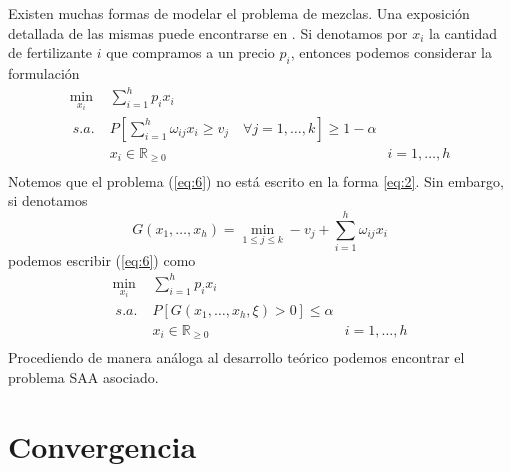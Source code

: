 \documentclass[twoside,a4paper,openright,12pt]{book}
\newcommand{\R}{\mathbb{R}}
\begin{document}
Existen muchas formas de modelar el problema de mezclas. Una exposición detallada de las mismas puede encontrarse en \cite{mixing}. Si denotamos por $x_i$ la cantidad de fertilizante $i$ que compramos a un precio $p_i$, entonces podemos considerar la formulación
\begin{align*}	
\min_{x_i} &\; \sum_{i=1}^h p_ix_i 
\\\
s.a.
& \; P\left[\sum_{i=1}^h \omega_{ij}x_i \geq v_j \quad \forall j=1,\dotsc,k\right]\geq 1-\alpha &\tag{6}\label{eq:6}\\
& \; x_i\in\R_{\geq 0} & i=1,\dotsc,h\\
\end{align*}
Notemos que el problema (\ref{eq:6}) no está escrito en la forma \ref{eq:2}. Sin embargo, si denotamos 
$$
G(x_1,\dotsc,x_h)=\min_{1\leq j \leq k}-v_j + \sum_{i=1}^h \omega_{ij}x_i
$$
podemos escribir (\ref{eq:6}) como 
\begin{align*}	
\min_{x_i} &\; \sum_{i=1}^h p_ix_i 
\\\
s.a.
& \; P[G(x_1,\dotsc,x_h,\xi)>0]\leq \alpha\\
& \; x_i\in\R_{\geq 0} & i=1,\dotsc,h\\
\end{align*}
Procediendo de manera análoga al desarrollo teórico podemos encontrar el problema SAA asociado.
\chapter{Convergencia}
\end{document}

